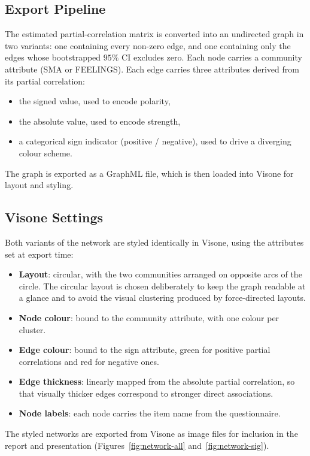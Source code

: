 \documentclass{article}
\begin{document}
\subsection{Export Pipeline}
The estimated partial-correlation matrix is converted into an undirected
graph in two variants: one containing every non-zero edge, and one
containing only the edges whose bootstrapped $95\%$ CI excludes zero.
Each node carries a community attribute (SMA or FEELINGS). Each edge
carries three attributes derived from its partial correlation:
\begin{itemize}
    \item the signed value, used to encode polarity,
    \item the absolute value, used to encode strength,
    \item a categorical sign indicator (positive / negative), used to
        drive a diverging colour scheme.
\end{itemize}
The graph is exported as a GraphML file, which is then loaded into
Visone for layout and styling.

\subsection{Visone Settings}
Both variants of the network are styled identically in Visone, using the
attributes set at export time:
\begin{itemize}
    \item \textbf{Layout}: circular, with the two communities arranged
        on opposite arcs of the circle. The circular layout is chosen
        deliberately to keep the graph readable at a glance and to
        avoid the visual clustering produced by force-directed layouts.

    \item \textbf{Node colour}: bound to the community attribute, with
        one colour per cluster.

    \item \textbf{Edge colour}: bound to the sign attribute, green for
        positive partial correlations and red for negative ones.

    \item \textbf{Edge thickness}: linearly mapped from the absolute
        partial correlation, so that visually thicker edges correspond
        to stronger direct associations.

    \item \textbf{Node labels}: each node carries the item name from
        the questionnaire.
\end{itemize}
The styled networks are exported from Visone as image files for inclusion in the report and presentation (Figures~\ref{fig:network-all} and~\ref{fig:network-sig}).
\end{document}
